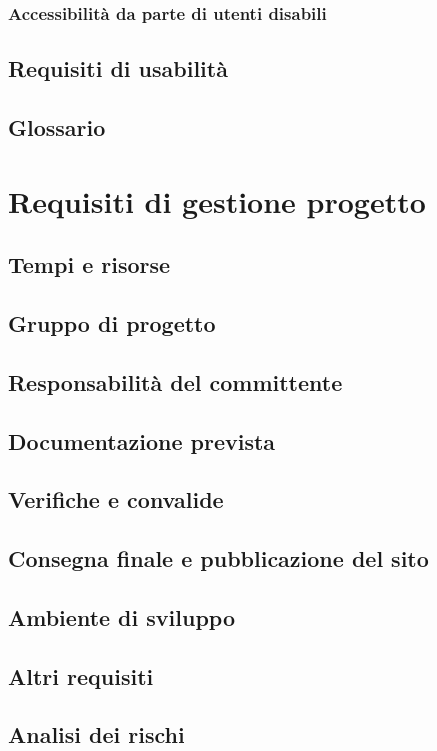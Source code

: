 \documentclass[a4paper,12pt,hidelinks]{report}
\begin{document}
	\subsection{Accessibilità da parte di utenti disabili}

\section{Requisiti di usabilità}

\section{Glossario}


\chapter{Requisiti di gestione progetto}

\section{Tempi e risorse}
\section{Gruppo di progetto}
\section{Responsabilità del committente}
\section{Documentazione prevista}
\section{Verifiche e convalide}
\section{Consegna finale e pubblicazione del sito}
\section{Ambiente di sviluppo}
\section{Altri requisiti}
\section{Analisi dei rischi}
\end{document}
